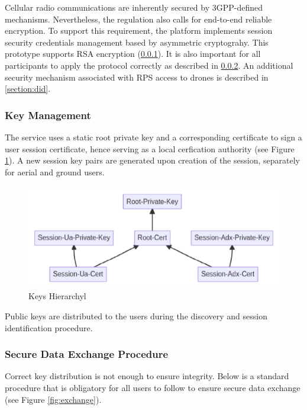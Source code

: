 \documentclass[a4paper,conference]{IEEEtran}
\begin{document}
Cellular radio communications are inherently secured by 3GPP-defined mechanisms. Nevertheless, the regulation also calls for end-to-end reliable encryption. To support this requirement, the platform implements session security credentials management based by asymmetric cryptograhy. This prototype supports RSA encryption (\ref{section:keys}). It is also important for all participants to apply the protocol correctly as described in \ref{section:exchange}. An additional security mechanism associated with RPS access to drones is described in \ref{section:did}.

\subsubsection{Key Management}
\label{section:keys}

The service uses a static root private key and a corresponding certificate to sign a user session certificate, hence serving as a local cerfication authority (see Figure \ref{fig:keys}). A new session key pairs are generated upon creation of the session, separately for aerial and ground users. 

\begin{figure}[!ht]
\centering
\includegraphics[width=0.9\linewidth]{images/keys.png}
\caption{Keys Hierarchyl}\label{fig:keys}
\end{figure}

Public keys are distributed to the users during the discovery and session identification procedure.

\subsubsection{Secure Data Exchange Procedure}
\label{section:exchange}

Correct key distribution is not enough to ensure integrity. Below is a standard procedure that is obligatory for all users to follow to ensure secure data exchange (see Figure \ref{fig:exchange}).
\end{document}

